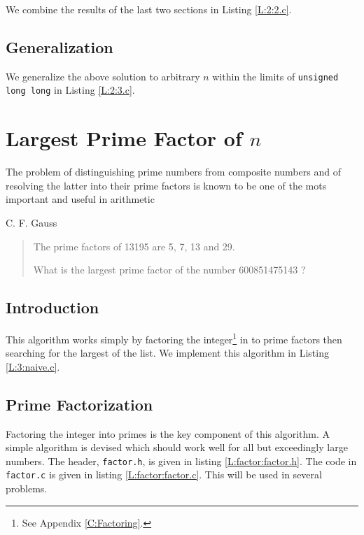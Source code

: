 \documentclass[oneside,12pt]{book}   	%
\newcounter{ex}
\newcounter{pr}
\theoremstyle{definition}
\begin{document}
\begin{spacing}{1.618}
		We combine the results of the last two sections in Listing \ref{L:2:2.c}. 
	
		

	\section{Generalization}
	
		We generalize the above solution to arbitrary $n$ within the limits of \texttt{unsigned long long} in Listing \ref{L:2:3.c}. 
		
		

	\chapter{Largest Prime Factor of $n$}
		\epigraph{The problem of distinguishing prime numbers from composite numbers and of resolving the latter into their prime factors is known to be one of the mots important and useful in arithmetic}{C. F. Gauss}
		\begin{quote}
			The prime factors of 13195 are 5, 7, 13 and 29.

			What is the largest prime factor of the number 600851475143 ?
		\end{quote}
	
		\section{Introduction}
			This algorithm works simply by factoring the integer\footnote{See Appendix \ref{C:Factoring}.} in to prime factors then searching for the largest of the list.  We implement this algorithm in Listing \ref{L:3:naive.c}. 
			
			
		
		\section{Prime Factorization}
		
			Factoring the integer into primes is the key component of this algorithm. A simple algorithm is devised which should work well for all but exceedingly large numbers. The header, \texttt{factor.h}, is given in listing \ref{L:factor:factor.h}.  The code in \texttt{factor.c} is given in listing \ref{L:factor:factor.c}. This will be used in several problems. 
		

\end{spacing}
\end{document}
